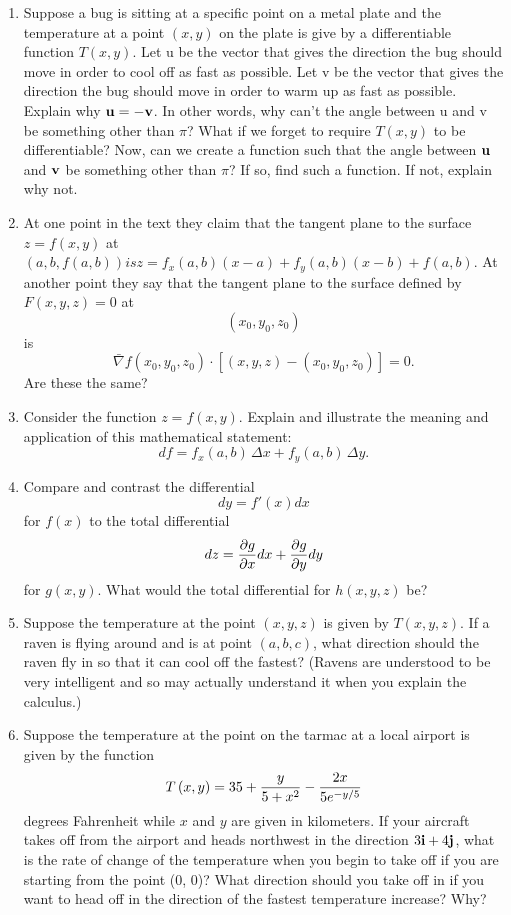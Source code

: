 \begin{enumerate}
\item  Suppose a bug is sitting at a specific point on a metal plate and the temperature at a point $(x, y)$ on the plate is give by a differentiable function $T(x, y)$.  Let u be the vector that gives the direction the bug should move in order to cool off as fast as possible. Let v be the vector that gives the direction the bug should move in order to warm up as fast as possible.  Explain why ${\bf{u}} = -{\bf{v}}$.  In other words, why can't the angle between u and v be something other than $\pi$?  
	What if we forget to require $T(x, y)$ to be differentiable?  Now, can we create a function such that the angle between ${\bf{u}}$ and ${\bf{v}}$ be something other than $\pi$?  If so, find such a function.  If not, explain why not.

\item  At one point in the text they claim that the tangent plane to the surface $z = f(x,y)$ at 
$(a, b, f(a, b)) is z = f_x(a, b)(x - a) + f_y(a, b)(x - b) + f(a, b)$.  At another point they say that the tangent plane to the surface defined by $F(x, y, z) = 0$ at $$\left( {x_0 ,y_0 ,z_0 } \right)$$ is $$\bar \nabla f\left( {x_0 ,y_0 ,z_0 } \right) \cdot \left[ {\left( {x,y,z} \right) - \left( {x_0 ,y_0 ,z_0 } \right)} \right] = 0.$$  Are these the same?

\item  Consider the function $z = f(x, y)$. Explain and illustrate the meaning and application of this mathematical statement:  $$df = f_x \left( {a,b} \right)\,\Delta x + f_y \left( {a,b} \right)\,\Delta y.$$

\item  Compare and contrast the differential $$dy = f'\left( x \right)dx$$ for $f(x)$ to the total differential $$dz = {{\partial g} \over {\partial x}}dx + {{\partial g} \over {\partial y}}dy$$ for $g(x, y)$.  What would the total differential for $h(x, y, z)$ be?

\item  Suppose the temperature at the point $(x, y, z)$ is given by $T(x, y, z)$.  If a raven is flying around and is at point $(a, b, c)$, what direction should the raven fly in so that it can cool off the fastest?  (Ravens are understood to be very intelligent and so may actually understand it when you explain the calculus.)

\item  Suppose the temperature at the point on the tarmac at a local airport is given by the function $$T\left( {x,y} \right) = 35 + {y \over {5 + x^2 }} - {{2x} \over {5e^{ - {y \mathord{\left/ {\vphantom {y 5}} \right. \kern-\nulldelimiterspace} 5}} }}$$ degrees Fahrenheit while $x$ and $y$ are given in kilometers.  If your aircraft takes off from the airport and heads northwest in the direction $3{\bf{i}} + 4{\bf{j}}$, what is the rate of change of the temperature when you begin to take off if you are starting from the point (0, 0)?  What direction should you take off in if you want to head off in the direction of the fastest temperature increase?  Why?


\end{enumerate}
